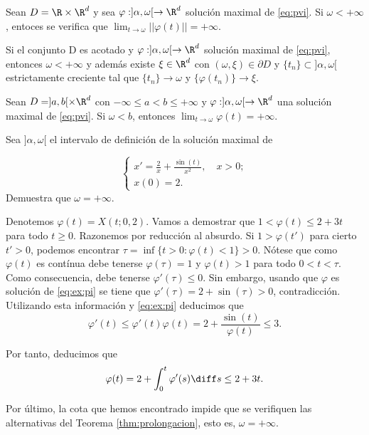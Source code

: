 \documentclass{article}
\begin{document}
\begin{corollary}
  Sean $D = \R \times \R^d$ y sea $\varphi: ]\alpha, \omega[ \to \R^d$ solución maximal de
  \eqref{eq:pvi}.  Si $\omega < +\infty$, entoces se verifica que
  $\lim_{t \to \omega} ||\varphi(t)|| = + \infty$.
\end{corollary}

\begin{corollary}
  Si el conjunto D es acotado y $\varphi: ]\alpha, \omega[ \to \R^d$ solución maximal de
  \eqref{eq:pvi}, entonces $\omega < +\infty$ y además existe $\xi \in \R^d$ con
  $(\omega, \xi) \in \partial D$ y $\{t_n\} \subset ]\alpha, \omega[$ estrictamente creciente tal
  que $\{t_n\} \to \omega$ y $\{\varphi(t_n)\} \to \xi$.
\end{corollary}


\begin{corollary} \label{cor:ab:lim} Sean $D = ]a,b[ \times \R^d$ con
  $-\infty \le a < b \le +\infty$ y $\varphi: ]\alpha, \omega[ \to \R^d$ una solución maximal de
  \eqref{eq:pvi}. Si $\omega < b$, entonces $\lim_{t \to \omega} \varphi(t) = +\infty$.
\end{corollary}

\begin{ex}
  Sea $]\alpha, \omega[$ el intervalo de definición de la solución maximal de
  
  \begin{equation}
    \label{eq:ex:pi}
    \begin{cases}
      x' = \frac{2}{x} + \frac{\sin(t)}{x^2}, \quad x > 0; \\
      x(0) = 2.
    \end{cases}
  \end{equation}
  Demuestra que $\omega = +\infty$.

  Denotemos $\varphi(t) = X(t; 0,2)$. Vamos a demostrar que $1 < \varphi(t) \le 2+3t$ para todo
  $t \ge 0$. Razonemos por reducción al absurdo. Si $1 > \varphi(t')$ para cierto $t' > 0$, podemos
  encontrar $\tau = \inf \{t > 0: \varphi(t) < 1\} > 0$. Nótese que como $\varphi(t)$ es contínua
  debe tenerse $\varphi(\tau) = 1$ y $\varphi(t) > 1$ para todo $0 < t < \tau$. Como consecuencia,
  debe tenerse $\varphi'(\tau) \le 0$. Sin embargo, usando que $\varphi$ es solución de
  \eqref{eq:ex:pi} se tiene que $\varphi'(\tau) = 2 + \sin(\tau) > 0$, contradicción. Utilizando
  esta información y \eqref{eq:ex:pi} deducimos que
  \[\varphi'(t) \le \varphi'(t) \varphi(t) = 2 + \frac{\sin(t)}{\varphi(t)} \le 3.\]

  Por tanto, deducimos que
  \[ \varphi(t) = 2 + \int_{0}^{t} \varphi'(s) \diff s \le 2 +3t.\]

  Por último, la cota que hemos encontrado impide que se verifiquen las alternativas del Teorema
  \ref{thm:prolongacion}, esto es, $\omega = +\infty$.
\end{ex}
\end{document}
